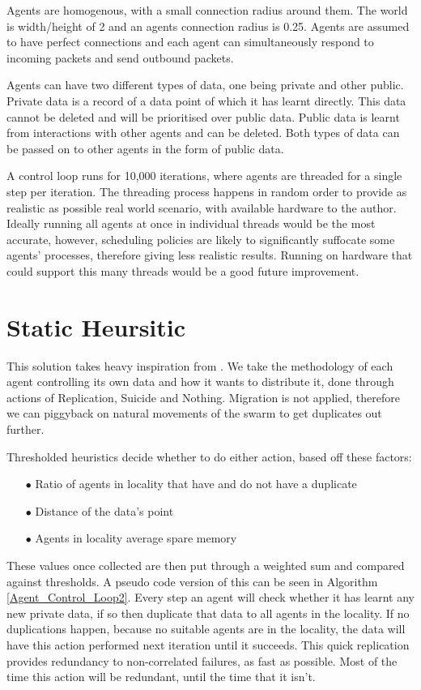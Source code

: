 \documentclass{UoYCSproject}
\begin{document}
Agents are homogenous, with a small connection radius around them.
The world is width/height of 2 and an agents connection radius is 0.25.
Agents are assumed to have perfect connections and each agent can simultaneously respond to incoming packets and send outbound packets.

Agents can have two different types of data, one being private and other public. 
Private data is a record of a data point of which it has learnt directly. 
This data cannot be deleted and will be prioritised over public data. 
Public data is learnt from interactions with other agents and can be deleted. 
Both types of data can be passed on to other agents in the form of public data.

A control loop runs for 10,000 iterations, where agents are threaded for a single step per iteration. 
The threading process happens in random order to provide as realistic as possible real world scenario, with available hardware to the author. 
Ideally running all agents at once in individual threads would be the most accurate, however, scheduling policies are likely to significantly suffocate some agents' processes, therefore giving less realistic results. 
Running on hardware that could support this many threads would be a good future improvement.


\section{Static Heursitic}
\label{sec:Simple2}

This solution takes heavy inspiration from \cite{Distributed Storage}. 
We take the methodology of each agent controlling its own data and how it wants to distribute it, done through actions of Replication, Suicide and Nothing.
Migration is not applied, therefore we can piggyback on natural movements of the swarm to get duplicates out further.

Thresholded heuristics decide whether to do either action, based off these factors:

\begin{itemize}
\itemsep-1em
\item[$\bullet$] Ratio of agents in locality that have and do not have a duplicate
\item[$\bullet$] Distance of the data’s point
\item[$\bullet$] Agents in locality average spare memory
\end{itemize}

These values once collected are then put through a weighted sum and compared against thresholds. 
A pseudo code version of this can be seen in Algorithm \ref{Agent_Control_Loop2}.
Every step an agent will check whether it has learnt any new private data, if so then duplicate that data to all agents in the locality.
If no duplications happen, because no suitable agents are in the locality, the data will have this action performed next iteration until it succeeds.
This quick replication provides redundancy to non-correlated failures, as fast as possible. 
Most of the time this action will be redundant, until the time that it isn’t.
\end{document}

